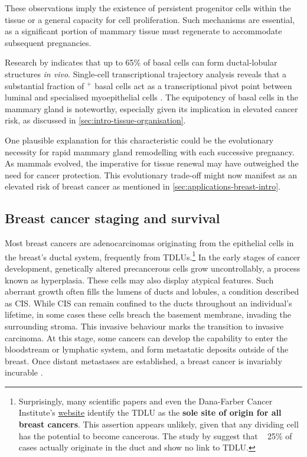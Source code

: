 These observations imply the existence of persistent progenitor cells within the tissue or a general capacity for cell proliferation. Such mechanisms are essential, as a significant portion of mammary tissue must regenerate to accommodate subsequent pregnancies.


Research by \textcite{Prater2014-qd} indicates that up to 65\% of basal cells can form ductal-lobular structures \emph{in vivo}. Single-cell transcriptional trajectory analysis reveals that a substantial fraction of $^+$ basal cells act as a transcriptional pivot point between luminal and specialised myoepithelial cells \parencite{Nguyen2018-jl}. The equipotency of basal cells in the mammary gland is noteworthy, especially given its implication in elevated cancer risk, as discussed in \cref{sec:intro-tissue-organisation}.

One plausible explanation for this characteristic could be the evolutionary necessity for rapid mammary gland remodelling with each successive pregnancy. As mammals evolved, the imperative for tissue renewal may have outweighed the need for cancer protection. This evolutionary trade-off might now manifest as an elevated risk of breast cancer as mentioned in \cref{sec:applications-breast-intro}.

\subsection{Breast cancer staging and survival}

Most breast cancers are adenocarcinomas originating from the epithelial cells in the breast's ductal system, frequently from \acp{TDLU}.\footnote{Surprisingly, many scientific papers and even the Dana-Farber Cancer Institute's \href{https://www.dana-farber.org/health-library/articles/what-is-lobular-breast-cancer-}{website} identify the \ac{TDLU} as the  \textbf{sole site of origin for all breast cancers}. This assertion appears unlikely, given that any dividing cell has the potential to become cancerous. The study by \textcite{Tabar2014-ea} suggest that ~ 25\% of cases actually originate in the duct and show no link to \ac{TDLU}.} In the early stages of cancer development, genetically altered precancerous cells grow uncontrollably, a process known as hyperplasia. These cells may also display atypical features. Such aberrant growth often fills the lumens of ducts and lobules, a condition described as \acf{CIS}. While \ac{CIS} can remain confined to the ducts throughout an individual's lifetime, in some cases these cells breach the basement membrane, invading the surrounding stroma. This invasive behaviour marks the transition to invasive carcinoma. At this stage, some cancers can develop the capability to enter the bloodstream or lymphatic system, and form metastatic deposits outside of the breast. Once distant metastases are established, a breast cancer is invariably incurable .


